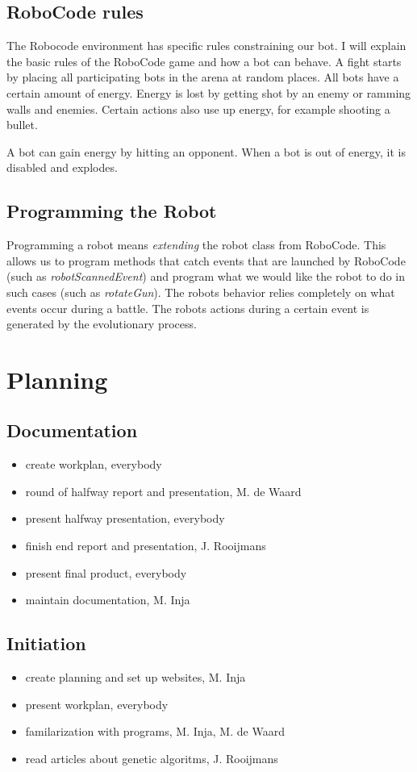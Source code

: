 \documentclass[a4paper,10pt]{article}
\begin{document}
\subsection{RoboCode rules}

The Robocode environment has specific rules constraining our bot. I will explain the basic rules of the RoboCode game and how a bot can behave.
A fight starts by placing all participating bots in the arena at random places. All bots have a certain amount of energy. Energy is lost by getting shot by an enemy or ramming walls and enemies. Certain actions also use up energy, for example shooting a bullet.

A bot can gain energy by hitting an opponent. When a bot is out of energy, it is disabled and explodes.

\subsection{Programming the Robot}
Programming a robot means \textit{extending} the robot class from RoboCode. This allows us to program methods that catch events that are launched by RoboCode (such as \textit{robotScannedEvent}) and program what we would like the robot to do in such cases (such as \textit{rotateGun}). The robots behavior relies completely on what events occur during a battle. The robots actions during a certain event is generated by the evolutionary process. 

\newpage
\section{Planning}
\subsection{Documentation}
\begin{itemize}
 \item create workplan, everybody
 \item round of halfway report and presentation, M. de Waard
 \item present halfway presentation, everybody
 \item finish end report and presentation, J. Rooijmans
 \item present final product, everybody
 \item maintain documentation, M. Inja
\end{itemize}

\subsection{Initiation}
\begin{itemize}
\item create planning and set up websites, M. Inja
\item present workplan, everybody
\item familarization with programs, M. Inja, M. de Waard
\item read articles about genetic algoritms, J. Rooijmans
\end{itemize}
\end{document}
